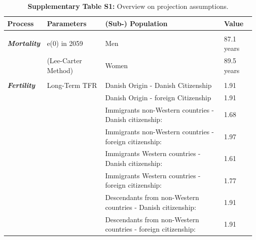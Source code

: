\begin{landscape}

\begin{table}[H]
\scriptsize
\centering
\caption*{\textbf{Supplementary Table S1:} Overview on projection assumptions.}
\medskip
\begin{tabular}{llll}
\hline
\textbf{Process} & \textbf{Parameters}        & \textbf{(Sub-) Population} & \textbf{Value}                 
\\
\hline
                   &                         &                                                               &                         \\
\textbf{\textit{Mortality}}          & e(0) in 2059            & Men                                                           & 87.1 years              \\
                   & (Lee-Carter Method)     & Women                                                         & 89.5 years              \\
                   &                         &                                                               &                         \\
\textbf{\textit{Fertility}}          & Long-Term TFR           & Danish Origin - Danish Citizenship                            & 1.91                    \\
                   &                         & Danish Origin - foreign Citizenship                           & 1.91                    \\
                   &                         & Immigrants non-Western countries - Danish citizenship:        & 1.68                    \\
                   &                         & Immigrants non-Western countries - foreign citizenship:       & 1.97                    \\
                   &                         & Immigrants Western countries - Danish citizenship:            & 1.61                    \\
                   &                         & Immigrants Western countries - foreign citizenship:           & 1.77                    \\
                   &                         & Descendants from non-Western countries - Danish citizenship:  & 1.91                    \\
                   &                         & Descendants from non-Western countries - foreign citizenship: & 1.91                    \\

\end{tabular}
\end{table}
\end{landscape}

